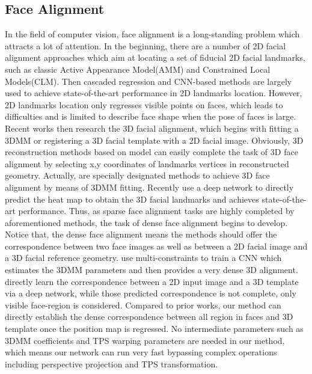 \documentclass[runningheads]{llncs}
\begin{document}
\subsection{Face Alignment}
In the field of computer vision, face alignment is a long-standing problem which attracts a lot of attention.
In the beginning, there are a number of 2D facial alignment approaches which aim at locating a set of fiducial 2D facial landmarks, such as classic Active Appearance Model(AMM)\cite{matthews2004active,saragih2007nonlinear,tzimiropoulos2013optimization} and Constrained Local Models(CLM)\cite{Kim2013Deformable,asthana2013robust}. 
Then cascaded regression\cite{dollar2010cascaded,Xiong2015Global} and CNN-based methods\cite{liang2015unconstrained,peng2016recurrent,Bulat2017How} are largely used to achieve state-of-the-art performance in 2D landmarks location. 
However, 2D landmarks location only regresses visible points on faces, which leads to difficulties and is limited to describe face shape when the pose of faces is large.
Recent works then research the 3D facial alignment, which begins with fitting a 3DMM\cite{mcdonagh2016joint,zhu2016face,gou2016shape} or registering a 3D facial template\cite{santa20163d,de20163d} with a 2D facial image. Obviously, 3D reconstruction methods based on model can easily complete the task of 3D face alignment by selecting x,y coordinates of landmarks vertices in reconstructed geometry. Actually, \cite{zhu2016face,Yu2017Learning,jourabloo2015pose} are specially designated methods to achieve 3D face alignment by means of 3DMM fitting. 
Recently \cite{bulat2016two,Bulat2017How} use a deep network to directly predict the heat map to obtain the 3D facial landmarks and achieves state-of-the-art performance. 
Thus, as sparse face alignment tasks are highly completed by aforementioned methods, the task of dense face alignment begins to develop.
Notice that, the dense face alignment means the methods should offer the correspondence between two face images as well as between a 2D facial image and a 3D facial reference geometry. \cite{liu2017dense} use multi-constraints to train a CNN which estimates the 3DMM parameters and then provides a very dense 3D alignment.
\cite{guler2017densereg,Yu2017Learning} directly learn the correspondence between a 2D input image and a 3D template via a deep network, while those predicted correspondence is not complete, only visible face-region is considered.
Compared to prior works, our method can directly establish the dense correspondence between all region in faces and 3D template once the position map is regressed.
No intermediate parameters such as 3DMM coefficients and TPS warping parameters are needed in our method, which means our network can run very fast bypassing complex operations including perspective projection and TPS transformation.
\end{document}
